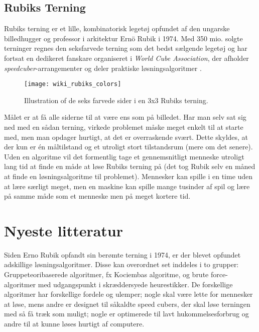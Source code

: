 \documentclass[../main.tex]{subfiles}
\begin{document}
\subsection*{Rubiks Terning}

Rubiks terning er et lille, kombinatorisk legetøj opfundet af den ungarske billedhugger og professor i arkitektur Ernö Rubik i 1974. Med 350 mio. solgte terninger regnes den seksfarvede terning som det bedst sælgende legetøj og har fortsat en dedikeret fanskare organiseret i \textit{World Cube Association}, der afholder \textit{speedcuber}-arrangementer og deler praktiske løsningsalgoritmer \cite{RubiksWiki}. 
\begin{figure}[H]
	\centering 
	\texttt{[image: wiki\_rubiks\_colors]}
	\caption{Illustration of de seks farvede sider i en 3x3 Rubiks terning.\protect\footnotemark}
\end{figure}
\noindent Målet er at få alle siderne til at være ens som på billedet. 
Har man selv sat sig ned med en sådan terning, virkede problemet måske meget enkelt til at starte med, men man opdager hurtigt, at det er overraskende svært.
Dette skyldes, at der kun er én måltilstand og et utroligt stort tilstandsrum (mere om det senere).
Uden en algoritme vil det formentlig tage et gennemsnitligt menneske utroligt lang tid at finde en måde at løse Rubiks terning på (det tog Rubik selv en måned at finde en løsningsalgoritme til problemet). 
Mennesker kan spille i en time uden at lære særligt meget, men en maskine kan spille mange tusinder af spil og lære på samme måde som et menneske men på meget kortere tid. 



\section{Nyeste litteratur}
\cite{RubiksMedium}
Siden Erno Rubik opfandt sin berømte terning i 1974, er der blevet opfundet adskillige løsningsalgoritmer.
Disse kan overordnet set inddeles i to grupper:
Gruppeteoribaserede algoritmer, fx Kociembas algoritme, og brute force-algoritmer med udgangspunkt i skræddersyede heurestikker.
De forskellige algoritmer har forskellige fordele og ulemper;
nogle skal være lette for mennesker at løse, mens andre er designet til såkaldte speed cubers, der skal løse terningen med så få træk som muligt;
nogle er optimerede til lavt hukommelsesforbrug og andre til at kunne løses hurtigt af computere. 
\end{document}
